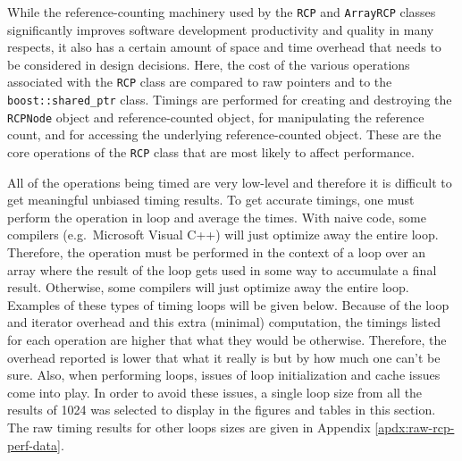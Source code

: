 \documentclass[pdf,ps2pdf,11pt]{SANDreport}
\begin{document}
While the reference-counting machinery used by the {}\texttt{RCP} and
{}\texttt{ArrayRCP} classes significantly improves software
development productivity and quality in many respects, it also has a
certain amount of space and time overhead that needs to be considered
in design decisions.  Here, the cost of the various operations
associated with the {}\texttt{RCP} class are compared to raw pointers
and to the {}\texttt{boost::shared\_ptr} class.  Timings are performed
for creating and destroying the {}\texttt{RCPNode} object and
reference-counted object, for manipulating the reference count, and
for accessing the underlying reference-counted object.  These are the
core operations of the {}\texttt{RCP} class that are most likely to
affect performance.

All of the operations being timed are very low-level and therefore it
is difficult to get meaningful unbiased timing results.  To get
accurate timings, one must perform the operation in loop and average
the times.  With naive code, some compilers (e.g.\ Microsoft Visual
C++) will just optimize away the entire loop.  Therefore, the
operation must be performed in the context of a loop over an array
where the result of the loop gets used in some way to accumulate a
final result.  Otherwise, some compilers will just optimize away the
entire loop.  Examples of these types of timing loops will be given
below.  Because of the loop and iterator overhead and this extra
(minimal) computation, the timings listed for each operation are
higher that what they would be otherwise.  Therefore, the overhead
reported is lower that what it really is but by how much one can't be
sure.  Also, when performing loops, issues of loop initialization and
cache issues come into play.  In order to avoid these issues, a single
loop size from all the results of 1024 was selected to display in the
figures and tables in this section.  The raw timing results for other
loops sizes are given in Appendix {}\ref{apdx:raw-rcp-perf-data}.
\end{document}
